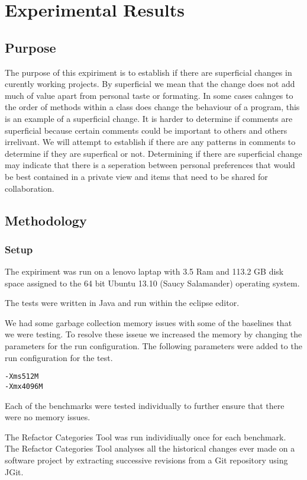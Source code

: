 
\chapter{Experimental Results}

\section{Purpose}
The purpose of this expiriment is to establish if there are superficial changes in curently working projects.  By superficial we mean that the change does not add much of value apart from personal taste or formating.  In some cases cahnges to the order of methods within a class does change the behaviour of a program, this is an example of a superficial change.  It is harder to determine if comments are superficial because certain comments could be important to others and others irrelivant. We will attempt to establish if there are any patterns in comments to determine if they are superfical or not.  Determining if there are superficial change may indicate that there is a seperation between personal preferences that would be best contained in a private view and items that need to be shared for collaboration.

\section{Methodology}
\subsection{Setup}
The expiriment was run on a lenovo laptap with 3.5 Ram and 113.2 GB disk space assigned to the 64 bit Ubuntu 13.10 (Saucy Salamander) operating system.
  

The tests were written in Java and run within the eclipse editor.

We had some garbage collection memory issues with some of the baselines that we were testing. To resolve these isseue we increased the memory by changing the parameters for the run configuration.  The following parameters were added to the run configuration for the test.

\begin{verbatim}
-Xms512M 
-Xmx4096M
\end{verbatim}

Each of the benchmarks were tested individually to further ensure that there were no memory issues. 

The Refactor Categories Tool was run individiually once for each benchmark.  The Refactor Categories Tool analyses all the historical changes ever made on a software project by extracting successive revisions from a Git repository using JGit.

